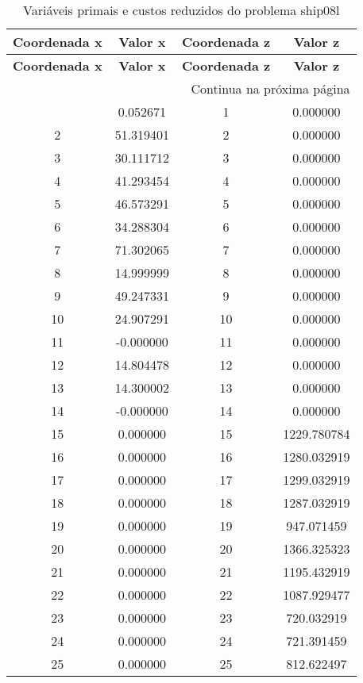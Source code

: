 \documentclass[12pt]{article}
\begin{document}
\begin{longtable}{@{}cccc@{}}
\caption{Variáveis primais e custos reduzidos do problema ship08l} \\
\toprule
\textbf{Coordenada x} & \textbf{Valor x} & \textbf{Coordenada z} & \textbf{Valor z} \\
\midrule
\endfirsthead

\toprule
\textbf{Coordenada x} & \textbf{Valor x} & \textbf{Coordenada z} & \textbf{Valor z} \\
\midrule
\endhead

\midrule \multicolumn{4}{r}{{Continua na próxima página}} \\ \midrule
\endfoot

\bottomrule
\endlastfoot
1 & 0.052671 & 1 & 0.000000 \\
2 & 51.319401 & 2 & 0.000000 \\
3 & 30.111712 & 3 & 0.000000 \\
4 & 41.293454 & 4 & 0.000000 \\
5 & 46.573291 & 5 & 0.000000 \\
6 & 34.288304 & 6 & 0.000000 \\
7 & 71.302065 & 7 & 0.000000 \\
8 & 14.999999 & 8 & 0.000000 \\
9 & 49.247331 & 9 & 0.000000 \\
10 & 24.907291 & 10 & 0.000000 \\
11 & -0.000000 & 11 & 0.000000 \\
12 & 14.804478 & 12 & 0.000000 \\
13 & 14.300002 & 13 & 0.000000 \\
14 & -0.000000 & 14 & 0.000000 \\
15 & 0.000000 & 15 & 1229.780784 \\
16 & 0.000000 & 16 & 1280.032919 \\
17 & 0.000000 & 17 & 1299.032919 \\
18 & 0.000000 & 18 & 1287.032919 \\
19 & 0.000000 & 19 & 947.071459 \\
20 & 0.000000 & 20 & 1366.325323 \\
21 & 0.000000 & 21 & 1195.432919 \\
22 & 0.000000 & 22 & 1087.929477 \\
23 & 0.000000 & 23 & 720.032919 \\
24 & 0.000000 & 24 & 721.391459 \\
25 & 0.000000 & 25 & 812.622497 \\

\end{longtable}
\end{document}
